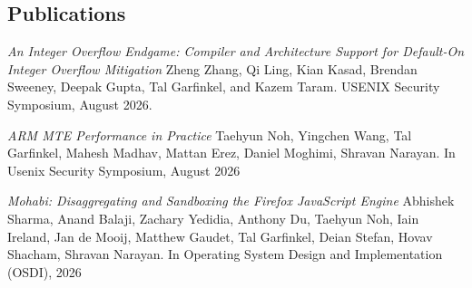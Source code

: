 \begin{resume}





\section{\sc Publications}

{\it An Integer Overflow Endgame: Compiler and Architecture Support for
Default-On Integer Overflow Mitigation} Zheng Zhang, Qi Ling, Kian Kasad,
Brendan Sweeney, Deepak Gupta, Tal Garfinkel, and Kazem Taram. 
USENIX Security Symposium, August 2026.

{\it ARM MTE Performance in Practice} Taehyun Noh, Yingchen Wang, Tal
Garfinkel, Mahesh Madhav, Mattan Erez, Daniel Moghimi, Shravan Narayan. In
Usenix Security Symposium, August 2026

{\it Mohabi: Disaggregating and Sandboxing the Firefox JavaScript Engine}
Abhishek Sharma, Anand Balaji, Zachary Yedidia, Anthony Du, Taehyun Noh, Iain
Ireland, Jan de Mooij, Matthew Gaudet, Tal Garfinkel, Deian Stefan, Hovav
Shacham, Shravan Narayan. In Operating System Design and Implementation (OSDI), 2026


\end{resume}
